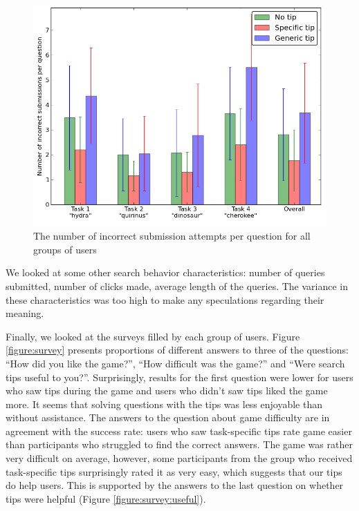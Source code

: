 \documentclass{sig-alternate}
\begin{document}
\begin{figure}[ht]
\centering
\includegraphics[scale=0.4]{img/incorrect}
\caption{The number of incorrect submission attempts per question for all groups of users}
\label{figure:incorrect}
\end{figure}

We looked at some other search behavior characteristics: number of queries submitted, number of clicks made, average length of the queries. The variance in these characteristics was too high to make any speculations regarding their meaning.

Finally, we looked at the surveys filled by each group of users.
Figure \ref{figure:survey} presents proportions of different answers to three of the questions: ``How did you like the game?'', ``How difficult was the game?'' and ``Were search tips useful to you?''.
Surprisingly, results for the first question were lower for users who saw tips during the game and users who didn't saw tips liked the game more.
It seems that solving questions with the tips was less enjoyable than without assistance.
The answers to the question about game difficulty are in agreement with the success rate: users who saw task-specific tips rate game easier than participants who struggled to find the correct answers.
The game was rather very difficult on average, however, some participants from the group who received task-specific tips surprisingly rated it as very easy, which suggests that our tips do help users.
This is supported by the answers to the last question on whether tips were helpful (Figure \ref{figure:survey:useful}).
\end{document}
